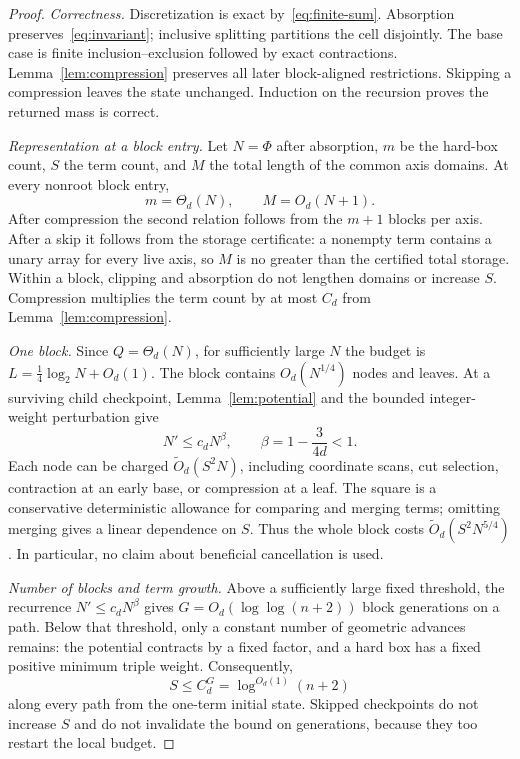 \documentclass[12pt,a4paper]{article}
\theoremstyle{definition}
\newcommand{\wtO}{\widetilde O}
\begin{document}
\begin{proof}
\emph{Correctness.} Discretization is exact by~\eqref{eq:finite-sum}.
Absorption preserves~\eqref{eq:invariant}; inclusive splitting partitions
the cell disjointly. The base case is finite inclusion--exclusion followed
by exact contractions. Lemma~\ref{lem:compression} preserves all later
block-aligned restrictions. Skipping a compression leaves the state
unchanged. Induction on the recursion proves the returned mass is correct.

\emph{Representation at a block entry.} Let $N=\Phi$ after absorption,
$m$ be the hard-box count, $S$ the term count, and $M$ the total length of
the common axis domains. At every nonroot block entry,
\[
                       m=\Theta_d(N),\qquad M=O_d(N+1).
\]
After compression the second relation follows from the $m+1$ blocks per
axis. After a skip it follows from the storage certificate: a nonempty
term contains a unary array for every live axis, so $M$ is no greater
than the certified total storage. Within a block, clipping and absorption
do not lengthen domains or increase $S$. Compression multiplies the term
count by at most $C_d$ from Lemma~\ref{lem:compression}.

\emph{One block.} Since $Q=\Theta_d(N)$, for sufficiently large $N$ the
budget is $L=\tfrac14\log_2N+O_d(1)$. The block contains
$O_d(N^{1/4})$ nodes and leaves. At a surviving child checkpoint,
Lemma~\ref{lem:potential} and the bounded integer-weight perturbation give
\[
                 N'\le c_dN^{\beta},\qquad
                 \beta=1-\frac{3}{4d}<1.
\]
Each node can be charged $\wtO_d(S^2N)$, including coordinate scans,
cut selection, contraction at an early base, or compression at a leaf.
The square is a conservative deterministic allowance for comparing and
merging terms; omitting merging gives a linear dependence on $S$.
Thus the whole block costs $\wtO_d(S^2N^{5/4})$. In particular, no claim
about beneficial cancellation is used.

\emph{Number of blocks and term growth.} Above a sufficiently large
fixed threshold, the recurrence $N'\le c_dN^\beta$ gives
$G=O_d(\log\log(n+2))$ block generations on a path. Below that threshold,
only a constant number of geometric advances remains: the potential
contracts by a fixed factor, and a hard box has a fixed positive minimum
triple weight. Consequently,
\[
                S\le C_d^G=\log^{O_d(1)}(n+2)
\]
along every path from the one-term initial state. Skipped checkpoints do
not increase $S$ and do not invalidate the bound on generations, because
they too restart the local budget.


\end{proof}
\end{document}

